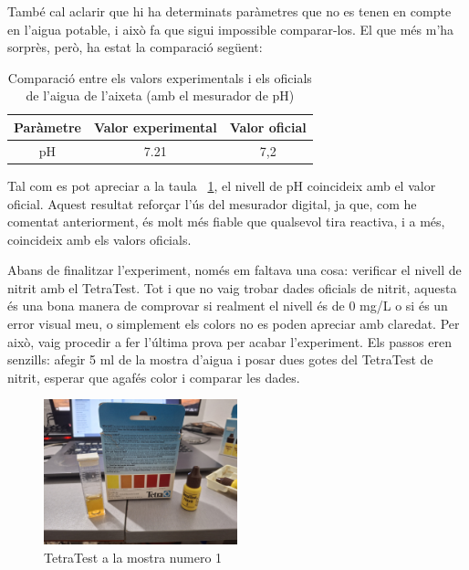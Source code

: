 També cal aclarir que hi ha determinats paràmetres que no es tenen en compte en l’aigua potable, i això fa que sigui impossible comparar-los. El que més m’ha sorprès, però, ha estat la comparació següent:
\begin{table}[h!]
\centering
\begin{tabular}{|c|c|c|}
\hline
\textbf{Paràmetre} & \textbf{Valor experimental} & \textbf{Valor oficial} \\
\hline \hline
pH & 7.21 & 7,2 \\
\hline
\end{tabular}
\caption{Comparació entre els valors experimentals i els oficials de l'aigua de l'aixeta (amb el mesurador de pH)}
\label{tab:comparacio_mesurador_ph1}
\end{table}

Tal com es pot apreciar a la taula~ \ref{tab:comparacio_mesurador_ph1}, el nivell de pH coincideix amb el valor oficial. Aquest resultat reforçar l'ús del mesurador digital, ja que, com he comentat anteriorment, és molt més fiable que qualsevol tira reactiva, i a més, coincideix amb els valors oficials.

Abans de finalitzar l’experiment, només em faltava una cosa: verificar el nivell de nitrit amb el TetraTest. Tot i que no vaig trobar dades oficials de nitrit, aquesta és una bona manera de comprovar si realment el nivell és de 0 mg/L o si és un error visual meu, o simplement els colors no es poden apreciar amb claredat. Per això, vaig procedir a fer l’última prova per acabar l’experiment. Els passos eren senzills: afegir 5 ml de la mostra d’aigua i posar dues gotes del TetraTest de nitrit, esperar que agafés color i comparar les dades.

\begin{figure}[H]
\centering
\includegraphics[width=0.5\textwidth]{./Figures/Tetra1.png}
\caption{TetraTest a la mostra numero 1}
\label{fig:TetraTestdeNitrit1}
\end{figure}

